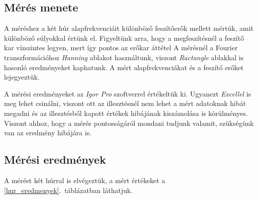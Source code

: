\documentclass[a4paper,12pt]{article}
\begin{document}
\subsection{Mérés menete}

A méréshez a két húr alapfrekvenciáit különböző feszítőerők mellett mértük, amit különböző súlyokkal értünk el. Figyeltünk arra, hogy a megfeszítésnél a feszítő kar vízszintes legyen, mert így pontos az erőkar áttétel A mérésnél a Fourier transzformációhoz \emph{Hanning} ablakot használtunk, viszont \emph{Ractangle} ablakkal is hasonló eredményeket kaphatunk. A mért alapfrekvenciákat és a feszítő erőket lejegyeztük.

A mérési eredményeket az \emph{Igor Pro} \cite{igor} szoftverrel értékeltük ki. Ugyanezt \emph{Excellel} \cite{excel} is meg lehet csinálni, viszont ott az illesztésnél nem lehet a mért adatoknak hibát megadni és az illesztésből kapott értékek hibájának kiszámolása is körülményes. Viszont ahhoz, hogy a mérés pontosságáról mondani tudjunk valamit, szükségünk van az eredmény hibájára is.

\subsection{Mérési eredmények}

A mérést két húrral is elvégeztük, a mért értékeket a \ref{hur_eredmenyek}.\ táblázatban láthatjuk.
\end{document}
